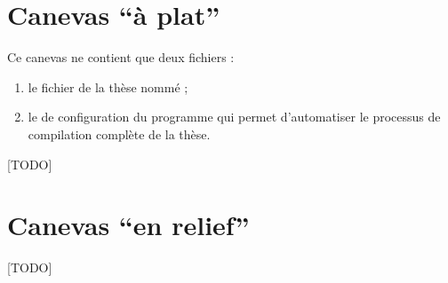 \section{Canevas \enquote{à plat}}
\label{sec:canevas-a-plat}

Ce canevas ne contient que deux fichiers :
\begin{enumerate}
\item le fichier de la thèse nommé  ;
\item le  de configuration du programme  qui
  permet d'automatiser le processus de compilation complète de la thèse.
\end{enumerate}

[TODO]

\section{Canevas \enquote{en relief}}
\label{sec:canevas-relief}

[TODO]

%
\iffalse
\fi
